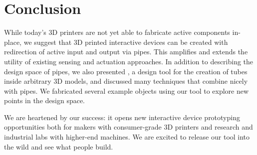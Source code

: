 \section{Conclusion}

While today's 3D printers are not yet able to fabricate active components in-place, we suggest that 3D printed interactive devices can be created with redirection of active input and output via pipes.  This amplifies and extends the utility of existing sensing and actuation approaches.  In addition to describing the design space of pipes, we also presented \systemnamenospace, a design tool for the creation of tubes inside arbitrary 3D models, and discussed many techniques that combine nicely with pipes.  We fabricated several example objects using our tool to explore new points in the design space.

We are heartened by our success: it opens new interactive device prototyping opportunities both for makers with consumer-grade 3D printers and research and industrial labs with higher-end machines.  We are excited to release our tool into the wild and see what people build.